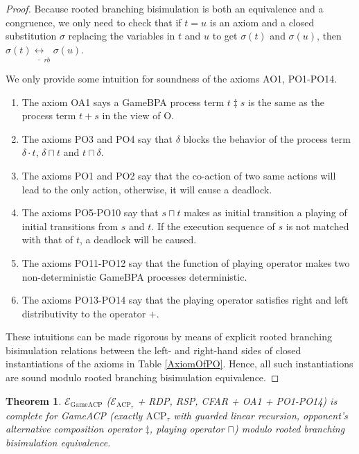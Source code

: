 \documentclass{fac}
\newtheorem{theorem}{Theorem}[section]
\begin{document}
\begin{proof}
Because rooted branching bisimulation is both an equivalence and a congruence, we only need to check that if $t=u$ is an axiom and a closed substitution $\sigma$ replacing the variables in $t$ and $u$ to get $\sigma(t)$ and $\sigma(u)$, then $\sigma(t)\underline{\leftrightarrow}_{rb}\sigma(u)$.

We only provide some intuition for soundness of the axioms AO1, PO1-PO14.

\begin{enumerate}
  \item The axiom OA1 says a GameBPA process term $t \ddagger s$ is the same as the process term $t + s$ in the view of O.
  \item The axioms PO3 and PO4 say that $\delta$ blocks the behavior of the process term $\delta \cdot t$, $\delta \sqcap t$ and $t \sqcap \delta$.
  \item The axioms PO1 and PO2 say that the co-action of two same actions will lead to the only action, otherwise, it will cause a deadlock.
  \item The axioms PO5-PO10 say that $s\sqcap t$ makes as initial transition a playing of initial transitions from $s$ and $t$. If the execution sequence of $s$ is not matched with that of $t$, a deadlock will be caused.
  \item The axioms PO11-PO12 say that the function of playing operator makes two non-deterministic GameBPA processes deterministic.
  \item The axioms PO13-PO14 say that the playing operator satisfies right and left distributivity to the operator $+$.
\end{enumerate}

These intuitions can be made rigorous by means of explicit rooted branching bisimulation relations between the left- and right-hand sides of closed instantiations of the axioms in Table \ref{AxiomOfPO}. Hence, all such instantiations are sound modulo rooted branching bisimulation equivalence.
\end{proof}

\begin{theorem}
$\mathcal{E}_{\textrm{GameACP}}$ ($\mathcal{E}_{\textrm{ACP}_\tau}$ + RDP, RSP, CFAR + OA1 + PO1-PO14) is complete for GameACP (exactly $\textrm{ACP}_\tau$ with guarded linear recursion, opponent's alternative composition operator $\ddagger$, playing operator $\sqcap$) modulo rooted branching bisimulation equivalence.
\end{theorem}
\end{document}
